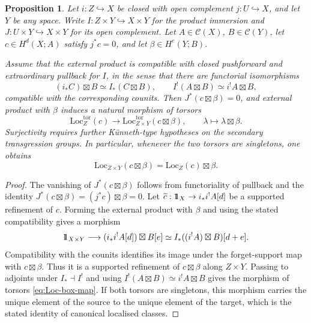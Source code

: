 \documentclass[10pt,a4paper,dvipsnames,x11names]{amsart}
\newcommand{\one}{1\hskip-3.5pt1}
\newcommand{\C}{\mathcal C}
\newcommand{\Loc}{\mathrm{Loc}}
\numberwithin{equation}{section}
\theoremstyle{plain}
\newtheorem{proposition}[proposition]{Proposition}
\theoremstyle{definition}
\theoremstyle{remark}
\begin{document}
\begin{proposition} \label{prop:Loc-box}
Let $i:Z\hookrightarrow X$ be closed with open complement $j:U\hookrightarrow X$, and let $Y$ be any space.
Write $I:Z\times Y\hookrightarrow X\times Y$ for the product immersion and $J:U\times Y\hookrightarrow X\times Y$
for its open complement. Let $A\in \C(X)$, $B\in \C(Y)$, let $c\in H^d(X;A)$ satisfy $j^*c=0$, and let
$\beta\in H^e(Y;B)$.

Assume that the external product is compatible with closed pushforward and extraordinary pullback for $I$, in the sense that there are functorial isomorphisms
\begin{equation*}
(i_*C)\boxtimes B\simeq I_*(C\boxtimes B),
\qquad
I^!(A\boxtimes B)\simeq i^!A\boxtimes B,
\end{equation*}
compatible with the corresponding counits. Then $J^*(c\boxtimes\beta)=0$, and external product with $\beta$ induces a natural morphism of torsors
\begin{equation}\label{eq:Loc-box-map}
\Loc_Z^{\mathrm{tor}}(c)
\longrightarrow
\Loc_{Z\times Y}^{\mathrm{tor}}(c\boxtimes\beta),
\qquad
\lambda\longmapsto \lambda\boxtimes\beta.
\end{equation}
Surjectivity requires further K\"unneth-type hypotheses on the secondary transgression groups.  In particular, whenever the two torsors are singletons, one obtains
\begin{equation*}
\Loc_{Z\times Y}(c\boxtimes \beta)=\Loc_Z(c)\boxtimes \beta.
\end{equation*}
\end{proposition}

\begin{proof}
The vanishing of $J^*(c\boxtimes\beta)$ follows from functoriality of pullback and the identity
$J^*(c\boxtimes\beta)=(j^*c)\boxtimes\beta=0$.
Let $\widetilde c:\one_X\to i_*i^!A[d]$ be a supported refinement of $c$.  Forming the external product with $\beta$ and using the stated compatibility gives a morphism
\begin{equation*}
\one_{X\times Y}
\longrightarrow
(i_*i^!A[d])\boxtimes B[e]
\simeq
I_*((i^!A)\boxtimes B)[d+e].
\end{equation*}
Compatibility with the counits identifies its image under the forget-support map with $c\boxtimes\beta$.  Thus it is a supported refinement of $c\boxtimes\beta$ along $Z\times Y$.  Passing to adjoints under $I_*\dashv I^!$ and using $I^!(A\boxtimes B)\simeq i^!A\boxtimes B$ gives the morphism of torsors \eqref{eq:Loc-box-map}.  If both torsors are singletons, this morphism carries the unique element of the source to the unique element of the target, which is the stated identity of canonical localised classes.
\end{proof}
\end{document}
